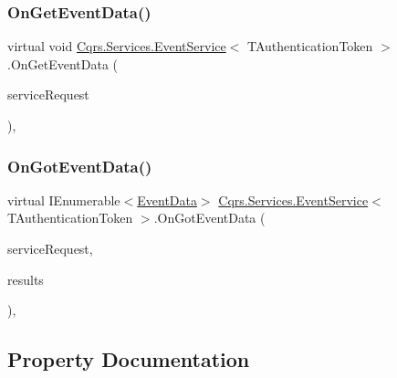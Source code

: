\subsubsection{\texorpdfstring{On\+Get\+Event\+Data()}{OnGetEventData()}}
{\footnotesize\ttfamily virtual void \hyperlink{classCqrs_1_1Services_1_1EventService}{Cqrs.\+Services.\+Event\+Service}$<$ T\+Authentication\+Token $>$.On\+Get\+Event\+Data (\begin{DoxyParamCaption}\item[{\hyperlink{interfaceCqrs_1_1Services_1_1IServiceRequestWithData}{I\+Service\+Request\+With\+Data}$<$ T\+Authentication\+Token, Guid $>$}]{service\+Request }\end{DoxyParamCaption})\hspace{0.3cm}{\ttfamily [protected]}, {\ttfamily [virtual]}}

\mbox{\label{classCqrs_1_1Services_1_1EventService_a16030e800b05cea77fd2183db7296804_a16030e800b05cea77fd2183db7296804}} 
\subsubsection{\texorpdfstring{On\+Got\+Event\+Data()}{OnGotEventData()}}
{\footnotesize\ttfamily virtual I\+Enumerable$<$\hyperlink{classCqrs_1_1Events_1_1EventData}{Event\+Data}$>$ \hyperlink{classCqrs_1_1Services_1_1EventService}{Cqrs.\+Services.\+Event\+Service}$<$ T\+Authentication\+Token $>$.On\+Got\+Event\+Data (\begin{DoxyParamCaption}\item[{\hyperlink{interfaceCqrs_1_1Services_1_1IServiceRequestWithData}{I\+Service\+Request\+With\+Data}$<$ T\+Authentication\+Token, Guid $>$}]{service\+Request,  }\item[{I\+Enumerable$<$ \hyperlink{classCqrs_1_1Events_1_1EventData}{Event\+Data} $>$}]{results }\end{DoxyParamCaption})\hspace{0.3cm}{\ttfamily [protected]}, {\ttfamily [virtual]}}



\subsection{Property Documentation}
\mbox{\label{classCqrs_1_1Services_1_1EventService_a7da2e2ec8d77d5972cea45a7ad482f39_a7da2e2ec8d77d5972cea45a7ad482f39}} 
